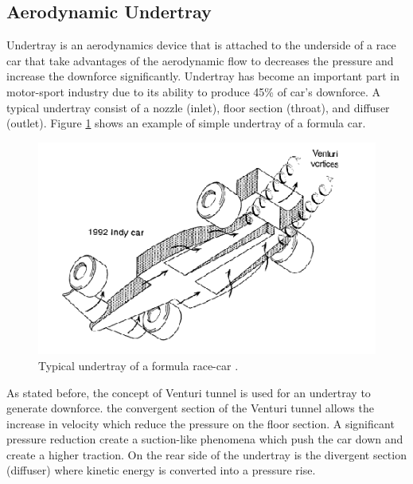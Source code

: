 \subsection{Aerodynamic Undertray}
Undertray is an aerodynamics device that is attached to the underside of a race car that take advantages of the aerodynamic flow to decreases the pressure and increase the downforce significantly. Undertray has become an important part in motor-sport industry due to its ability to produce 45\% of car's downforce\cite{Katz1995RaceSpeed}. A typical undertray consist of a nozzle (inlet), floor section (throat), and diffuser (outlet).  Figure \ref{fig:underbody} shows an example of simple undertray of a formula car.

\begin{figure}[!ht]
    \centering
    \includegraphics[scale = 0.8]{Figures/underbody.PNG}
    \caption{Typical undertray of a formula race-car \cite{Katz1995RaceSpeed}.}
    \label{fig:underbody}
\end{figure}

\noindent As stated before, the concept of Venturi tunnel is used for an undertray to generate downforce. the convergent section of the Venturi tunnel allows the increase in velocity which reduce the pressure on the floor section. A significant pressure reduction create a suction-like phenomena which push the car down and create a higher traction. On the rear side of the undertray is the divergent section (diffuser) where kinetic energy is converted into a pressure rise. 


